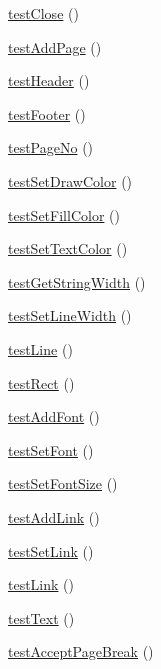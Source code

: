\begin{DoxyCompactItemize}
\item 
\hyperlink{class_f_p_d_f_test_adca50b30895ba89d735672fad56f6b0d}{testClose} ()
\item 
\hyperlink{class_f_p_d_f_test_a2d6010027612171bc7a537a60f4faa85}{testAddPage} ()
\item 
\hyperlink{class_f_p_d_f_test_a19b6fc728e839dc11d0e1a51de611b5e}{testHeader} ()
\item 
\hyperlink{class_f_p_d_f_test_ab59f9affc99c4a139bb4a2a59eb671a6}{testFooter} ()
\item 
\hyperlink{class_f_p_d_f_test_a17eedcf2cff8ca7679f512b54ce939bc}{testPageNo} ()
\item 
\hyperlink{class_f_p_d_f_test_a9fef98ec07c3c5af5a9b295a34fe0a32}{testSetDrawColor} ()
\item 
\hyperlink{class_f_p_d_f_test_a08cff29015594e20886053b7ae7cc897}{testSetFillColor} ()
\item 
\hyperlink{class_f_p_d_f_test_a91acaaf45bf68b9129756e7618de4683}{testSetTextColor} ()
\item 
\hyperlink{class_f_p_d_f_test_ab49ba3bd8551059cea48f2929b32b61a}{testGetStringWidth} ()
\item 
\hyperlink{class_f_p_d_f_test_a1c589e119a8e5cf461248b101e3c77af}{testSetLineWidth} ()
\item 
\hyperlink{class_f_p_d_f_test_a984a4f0a8b6f12f1cc2474fc0561051f}{testLine} ()
\item 
\hyperlink{class_f_p_d_f_test_a1d7b051b0fc343e9aea5c7add0f50079}{testRect} ()
\item 
\hyperlink{class_f_p_d_f_test_aa7c6ae9047be47e7b38c0fbf52dd8619}{testAddFont} ()
\item 
\hyperlink{class_f_p_d_f_test_a36bed25ac66224faa8a65bc191926ce1}{testSetFont} ()
\item 
\hyperlink{class_f_p_d_f_test_aa1aac326b42884a53ded3b4225a6a9bc}{testSetFontSize} ()
\item 
\hyperlink{class_f_p_d_f_test_a1895a422f29864b8ed7323e150ed15ee}{testAddLink} ()
\item 
\hyperlink{class_f_p_d_f_test_a289ccd19029ec26d4e311f4d650128ca}{testSetLink} ()
\item 
\hyperlink{class_f_p_d_f_test_aef6ea3b0fc374fd6b25b7bec89e83255}{testLink} ()
\item 
\hyperlink{class_f_p_d_f_test_a4d2fe44ceafdc76f64d18989cb664187}{testText} ()
\item 
\hyperlink{class_f_p_d_f_test_aacd187932d4ba95945d7368040b0b0f9}{testAcceptPageBreak} ()
\item 

\end{DoxyCompactItemize}
